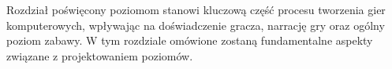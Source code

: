 Rozdział poświęcony poziomom stanowi kluczową część procesu tworzenia gier komputerowych, wpływając na doświadczenie gracza, narrację gry oraz ogólny poziom zabawy. W tym rozdziale omówione zostaną fundamentalne aspekty związane z projektowaniem poziomów.